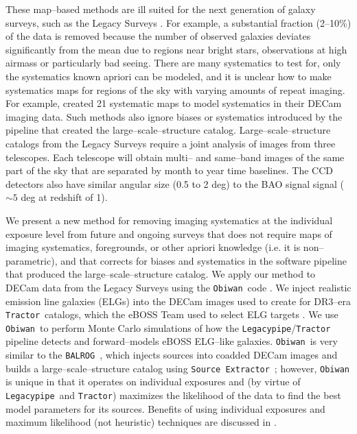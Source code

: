 \documentclass[a4paper,fleqn,usenatbib]{mnras}
\newcommand{\tractor}{{\tt Tractor}}
\newcommand{\legacypipe}{{\tt Legacypipe}}
\newcommand{\obiwan}{{\tt Obiwan}}
\newcommand{\balrog}{{\tt BALROG}}
\newcommand{\sextractor}{{\tt Source Extractor}~}
\begin{document}
These map--based methods are ill suited for the next generation of galaxy surveys, such as the Legacy Surveys \citep{overviewPaper}. For example, a substantial fraction (2--10\%) of the data is removed because the number of observed galaxies deviates significantly from the mean due to regions near bright stars, observations at high airmass or particularly bad seeing. There are many systematics to test for, only the systematics known apriori can be modeled, and it is unclear how to make  systematics maps for regions of the sky with varying amounts of repeat imaging. For example, \cite{elvinpoole} 
created 21 systematic maps to model systematics in their DECam imaging data. Such methods also ignore biases or systematics introduced by the pipeline that created the large--scale--structure catalog. Large--scale--structure catalogs from the Legacy Surveys require a joint analysis of images from three telescopes. Each telescope will obtain multi-- and same--band images of the same part of the sky that are separated by month to year time baselines. The CCD detectors also have similar angular size (0.5 to 2 deg) to the BAO signal signal ($\sim 5$ deg at redshift of 1).

We present a new method for removing imaging systematics at the individual exposure level from future and ongoing surveys that does not require maps of imaging systematics, foregrounds, or other apriori knowledge (i.e. it is non--parametric), and that corrects for biases and systematics in the software pipeline that produced the large--scale--structure catalog. We apply our method to DECam data from the Legacy Surveys using the \obiwan\, code \citep{obiwanMethods}. We inject realistic emission line galaxies (ELGs) into the DECam images used to create for DR3--era \tractor\, catalogs, which the eBOSS Team used to select ELG targets \citep{anand17}. We use \obiwan\, to perform Monte Carlo simulations of how the \legacypipe/\tractor\, pipeline \citep{tractorPaper} detects and forward--models eBOSS ELG--like galaxies. \obiwan\, is very similar to the \balrog\, \citep{balrog}, which injects sources into coadded DECam images and builds a large--scale--structure catalog using \sextractor; however, \obiwan\, is unique in that it operates on individual exposures and (by virtue of \legacypipe\, and \tractor) maximizes the likelihood of the data to find the best model parameters for its sources. Benefits of using individual exposures and maximum likelihood (not heuristic) techniques are discussed in \cite{obiwanMethods}.
\end{document}
